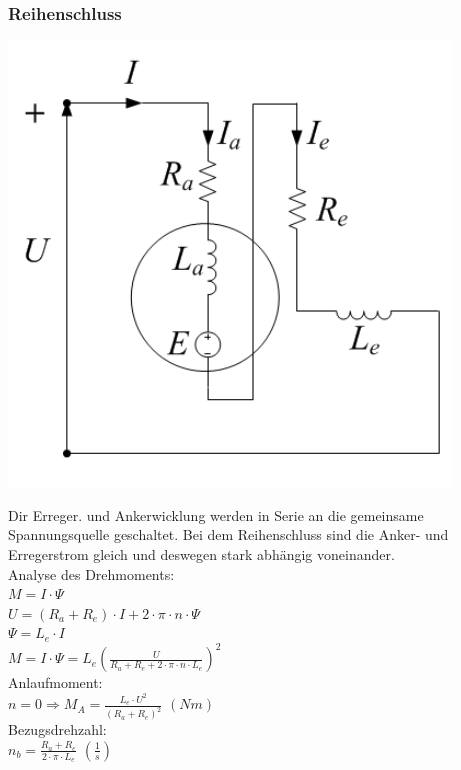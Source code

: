 \subsubsection{Reihenschluss}
\begin{minipage}{0.3 \linewidth}
\includegraphics[width = \linewidth]{./Pics/VL45/Reihenschluss}
\end{minipage}
\begin{minipage}{0.7 \linewidth}
Dir Erreger. und Ankerwicklung werden in Serie an die gemeinsame Spannungsquelle geschaltet. Bei dem Reihenschluss sind die Anker- und Erregerstrom gleich und deswegen stark abhängig voneinander. \\

Analyse des Drehmoments: \\

$M = I \cdot \Psi$ \\

$U = (R_a + R_e) \cdot I + 2 \cdot \pi \cdot n \cdot \Psi$ \\

$\Psi = L_e \cdot I$ \\

$M = I \cdot \Psi = L_e (\frac{U}{R_a + R_e + 2 \cdot \pi \cdot n \cdot L_e})^2$ \\

Anlaufmoment: \\

$n = 0 \Rightarrow M_A = \frac{L_e \cdot U^2}{(R_a + R_e)^2}$   $(Nm)$ \\

Bezugsdrehzahl: \\

$n_b = \frac{R_a + R_e}{2 \cdot \pi \cdot L_e}$   $(\frac{1}{s})$
\end{minipage}

